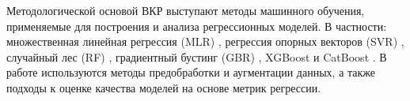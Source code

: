 Методологической основой ВКР выступают методы машинного обучения, применяемые для построения и анализа регрессионных моделей. В частности: множественная линейная регрессия (MLR) \cite{rao1973}, регрессия опорных векторов (SVR) \cite{vapnik1995, vapnik1997svr}, случайный лес (RF) \cite{Breiman2001}, градиентный бустинг (GBR) \cite{friedman2001, hastie2009elements}, XGBoost \cite{Chen2016} и CatBoost \cite{prokhorenkova2018catboost}. В работе используются методы предобработки и аугментации данных, а также подходы к оценке качества моделей на основе метрик регрессии.



